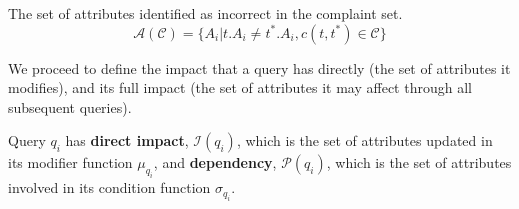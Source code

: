 \begin{definition} 
	The set of attributes identified as incorrect in the complaint set.
	\[\mathcal{A}(\mathcal{C}) = \{A_i | t.A_i \neq t^*.A_i, c(t,t^*) \in \mathcal{C}\}\]
\end{definition} 

We proceed to define the impact that a query has directly (the set of
attributes it modifies), and its full impact (the set of attributes it may
affect through all subsequent queries).

\begin{definition} \label{eq:dependency}
    Query $q_i$ has \textbf{direct impact}, $\mathcal{I}(q_i)$, which is
    the set of attributes updated in its modifier function $\mu_{q_i}$,
    and \textbf{dependency},
    $\mathcal{P}(q_i)$, which is the set of attributes involved in its
    condition function $\sigma_{q_i}$. 
    

\end{definition}

